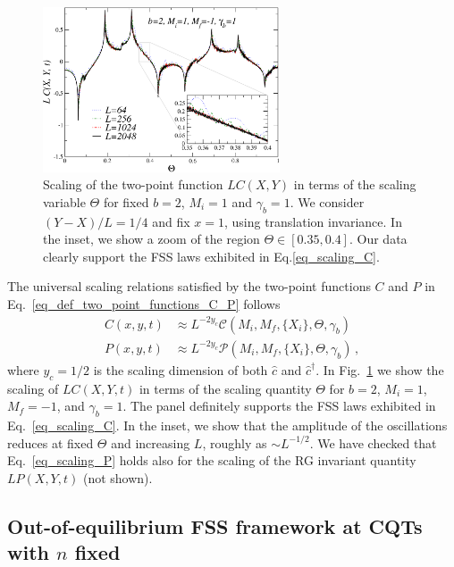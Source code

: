 \begin{figure}
    \centering
    \includegraphics[width=7cm]{imm/Cscaling2b.pdf}
    \caption{Scaling of the two-point function $L C(X, Y)$ in terms of the scaling variable $\Theta$ for fixed $b=2$, $M_i=1$ and $\gamma_b=1$. We consider $(Y-X)/L=1/4$ and fix $x=1$, using translation invariance. In the inset, we show a zoom of the region $\Theta\in[0.35, 0.4]$. Our data clearly support the FSS laws exhibited in Eq.\eqref{eq_scaling_C}.}
    \label{fig_Cscaling2b}
\end{figure}

The universal scaling relations satisfied by the two-point functions $C$ and $P$ in Eq.~\eqref{eq_def_two_point_functions_C_P} follows
\begin{align}
    C(x, y, t) &\approx L^{-2y_c}\mathcal{C}(M_i, M_f, \{X_i\}, \Theta, \gamma_b)    \label{eq_scaling_C}\\
    P(x, y, t) &\approx L^{-2y_c}\mathcal{P}(M_i, M_f, \{X_i\}, \Theta, \gamma_b)\,,
    \label{eq_scaling_P}
\end{align}
where $y_c=1/2$ is the scaling dimension of both $\hat{c}$ and $\hat{c}^\dagger$. 
In Fig.~\ref{fig_Cscaling2b} we show the scaling of $LC(X, Y, t)$ in terms of the scaling quantity $\Theta$ for $b=2$, $M_i=1$, $M_f=-1$, and $\gamma_b=1$. The panel definitely supports the FSS laws exhibited in Eq.~\eqref{eq_scaling_C}. In the inset, we show that the amplitude of the oscillations reduces at fixed $\Theta$ and increasing $L$, roughly as $\sim L^{-1/2}$. We have checked that Eq.~\eqref{eq_scaling_P} holds also for the scaling of the RG invariant quantity $LP(X, Y, t)$ (not shown).  
\subsection{Out-of-equilibrium FSS framework at CQTs with $n$ fixed}
\label{sec_out-of-equilibrium FSS fixed n}

